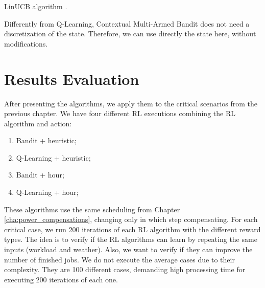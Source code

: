 \IncMargin{1em}
\begin{algorithm}[!htb]
    \footnotesize
    \SetAlgoLined
    \caption{LinUCB algorithm \cite{li2010contextual}.}
    \label{alg:linucb}
\end{algorithm}
\DecMargin{1em}

Differently from Q-Learning, Contextual Multi-Armed Bandit does not need a discretization of the state. Therefore, we can use directly the state here, without modifications.

\section{Results Evaluation}

After presenting the algorithms, we apply them to the critical scenarios from the previous chapter. We have four different RL executions combining the RL algorithm and action: 

\begin{enumerate}
    \item Bandit + heuristic;
    \item Q-Learning + heuristic;
    \item Bandit + hour;
    \item Q-Learning + hour;
\end{enumerate}

These algorithms use the same scheduling from Chapter \ref{cha:power_compensations}, changing only in which step compensating. For each critical case, we run 200 iterations of each RL algorithm with the different reward types. The idea is to verify if the RL algorithms can learn by repeating the same inputs (workload and weather). Also, we want to verify if they can improve the number of finished jobs. We do not execute the average cases due to their complexity. They are 100 different cases, demanding high processing time for executing 200 iterations of each one. 

